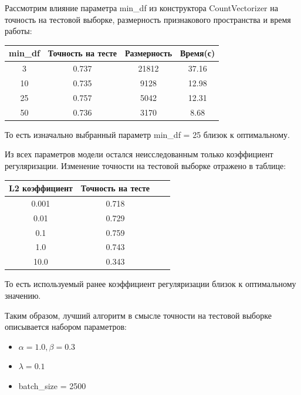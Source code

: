 \documentclass{article}
\begin{document}
            Рассмотрим влияние параметра min\_df из конструктора CountVectorizer на точность на тестовой выборке, размерность признакового пространства и время работы:
            \begin{center}
                \begin{tabular}{| c | c | c | c |}
                    \hline
                    min\_df & Точность на тесте & Размерность & Время(с) \\
                    \hline
                    3 & 0.737 & 21812 & 37.16\\
                    \hline
                    10 & 0.735 & 9128 & 12.98 \\
                    \hline
                    25 & 0.757 & 5042 & 12.31 \\
                    \hline
                    50 & 0.736 & 3170 & 8.68 \\
                    \hline
                \end{tabular}
            \end{center}

            То есть изначально выбранный параметр min\_df = 25 близок к оптимальному.

            Из всех параметров модели остался неисследованным только коэффициент регуляризации. Изменение точности на тестовой выборке отражено в таблице:
            \begin{center}
                \begin{tabular}{| c | c | c | c |}
                    \hline
                    L2 коэффициент & Точность на тесте \\
                    \hline
                    0.001 & 0.718 \\
                    \hline
                    0.01 & 0.729 \\
                    \hline
                    0.1 & 0.759 \\
                    \hline
                    1.0 & 0.743 \\
                    \hline
                    10.0 & 0.343 \\
                    \hline
                \end{tabular}
            \end{center}

            То есть используемый ранее коэффициент регуляризации близок к оптимальному значению.

            Таким образом, лучший алгоритм в смысле точности на тестовой выборке описывается набором параметров:
            \begin{itemize}
                \item $\alpha = 1.0, \beta=0.3$
                \item $\lambda = 0.1$
                \item batch\_size = 2500
            \end{itemize}
\end{document}
